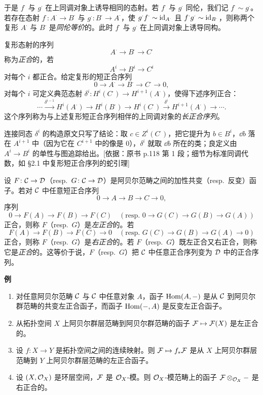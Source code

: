 于是 $f^\cdot$ 与 $g^\cdot$ 在上同调对象上诱导相同的态射。若 $f^\cdot$ 与 $g^\cdot$ 同伦，我们记 $f^\cdot\sim g^\cdot$。若存在态射 $f^\cdot\colon A^\cdot\to B^\cdot$ 与 $g^\cdot\colon B^\cdot\to A^\cdot$，使 $g^\cdot f^\cdot\sim\operatorname{id}_{A^\cdot}$ 且 $f^\cdot g^\cdot\sim\operatorname{id}_{B^\cdot}$，则称两个复形 $A^\cdot$ 与 $B^\cdot$ 是\emph{同伦等价}的。此时 $f^\cdot$ 与 $g^\cdot$ 在上同调对象上诱导同构。

复形态射的序列
\[
A^\cdot\to B^\cdot\to C^\cdot
\]
称为\emph{正合}的，若
\[
A^i\to B^i\to C^i
\]
对每个 $i$ 都正合。给定复形的短正合序列
\[
0\to A^\cdot\to B^\cdot\to C^\cdot\to 0,
\]
对每个 $i$ 可定义典范态射 $\delta^i\colon H^i(C^\cdot)\to H^{i+1}(A^\cdot)$，使得下述序列正合：
\[
\cdots\xrightarrow{\delta^{i-1}}H^i(A^\cdot)\to H^i(B^\cdot)\to H^i(C^\cdot)\xrightarrow{\delta^i}H^{i+1}(A^\cdot)\to\cdots.
\]
这个序列称为与上述复形短正合序列相伴的上同调对象的\emph{长正合序列}。
\begin{tnote}
连接同态 $\delta^i$ 的构造原文只写了结论：取 $c\in Z^i(C^\cdot)$，把它提升为 $b\in B^i$，$\dd b$ 落在 $A^{i+1}$ 中（因为它在 $C^{i+1}$ 中的像是 $0$），$\delta^i$ 就取 $\dd b$ 所在的类；良定义由 $A^i\to B^i$ 的单性与图追踪给出。[依据：原书 p.118 第 1 段；细节为标准同调代数，如 \S 2.1 中复形短正合序列的蛇引理]
\end{tnote}

设 $F\colon\mathcal{C}\to\mathcal{D}$（resp.\ $G\colon\mathcal{C}\to\mathcal{D}$）是阿贝尔范畴之间的加性共变（resp.\ 反变）函子。若对 $\mathcal{C}$ 中任意短正合序列
\[
0\to A\to B\to C\to 0,
\]
序列
\[
0\to F(A)\to F(B)\to F(C)\quad(\text{resp. } 0\to G(C)\to G(B)\to G(A))
\]
正合，则称 $F$（resp.\ $G$）是\emph{左正合}的。若
\[
F(A)\to F(B)\to F(C)\to 0\quad(\text{resp. } G(C)\to G(B)\to G(A)\to 0)
\]
正合，则称 $F$（resp.\ $G$）是\emph{右正合}的。若 $F$（resp.\ $G$）既左正合又右正合，则称它是\emph{正合}的。这等价于说，$F$（resp.\ $G$）把 $\mathcal{C}$ 中任意正合序列变为 $\mathcal{D}$ 中的正合序列。

\noindent\textbf{例}
\begin{enumerate}[label=\arabic*.,leftmargin=2.4em,itemsep=0.2em]
  \item 对任意阿贝尔范畴 $\mathcal{C}$ 与 $\mathcal{C}$ 中任意对象 $A$，函子 $\operatorname{Hom}(A,-)$ 是从 $\mathcal{C}$ 到阿贝尔群范畴的共变左正合函子，而函子 $\operatorname{Hom}(-,A)$ 是反变左正合函子。
  \item 从拓扑空间 $X$ 上阿贝尔群层范畴到阿贝尔群范畴的函子 $\mathcal{F}\mapsto\mathcal{F}(X)$ 是左正合的。
  \item 设 $f\colon X\to Y$ 是拓扑空间之间的连续映射。则 $\mathcal{F}\mapsto f_*\mathcal{F}$ 是从 $X$ 上阿贝尔群层范畴到 $Y$ 上阿贝尔群层范畴的左正合函子。
  \item 设 $(X,\mathcal{O}_X)$ 是环层空间，$\mathcal{F}$ 是 $\mathcal{O}_X$-模。则 $\mathcal{O}_X$-模范畴上的函子 $\mathcal{F}\otimes_{\mathcal{O}_X}-$ 是右正合的。
\end{enumerate}

